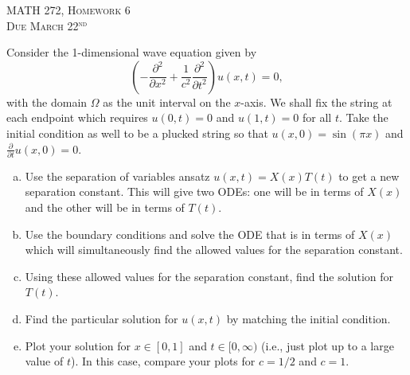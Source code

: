 \documentclass[12pt]{article} %
\begin{document}
\begin{center}
   \textsc{\large MATH 272, Homework 6}\\
   \textsc{Due March 22$^\textrm{nd}$}
\end{center}
\vspace{.5cm}

\begin{problem}
    Consider the 1-dimensional wave equation given by
    \[
    \left( - \frac{\partial^2}{\partial x^2} +\frac{1}{c^2} \frac{\partial^2}{\partial t^2} \right) u(x,t) =0,
    \]
    with the domain $\Omega$ as the unit interval on the $x$-axis.  We shall fix the string at each endpoint which requires $u(0,t)=0$ and $u(1,t)=0$ for all $t$.  Take the initial condition as well to be a plucked string so that $u(x,0)=\sin(\pi x)$ and $\frac{\partial}{\partial t}u(x,0)=0$. 
    \begin{enumerate}[(a)]
        \item Use the separation of variables ansatz $u(x,t)=X(x)T(t)$ to get a new separation constant. This will give two ODEs: one will be in terms of $X(x)$ and the other will be in terms of $T(t)$.
        \item Use the boundary conditions and solve the ODE that is in terms of $X(x)$ which will simultaneously find the allowed values for the separation constant.
        \item Using these allowed values for the separation constant, find the solution for $T(t)$.
        \item Find the particular solution for $u(x,t)$ by matching the initial condition.
        \item Plot your solution for $x\in [0,1]$ and $t\in [0,\infty)$ (i.e., just plot up to a large value of $t$). In this case, compare your plots for $c=1/2$ and $c=1$.
    \end{enumerate}
\end{problem}
\end{document}
